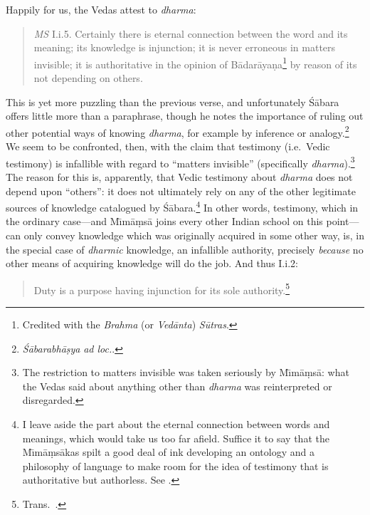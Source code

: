 ﻿\documentclass[11pt]{amsart}
\begin{document}
Happily for us, the Vedas attest to \emph{dharma}:\small \begin{quote}\emph{MS} I.i.5. Certainly there is eternal connection between the word and its meaning; its knowledge is injunction; it is never erroneous in matters invisible; it is authoritative in the opinion of B\=adar\=aya\d na\footnote{Credited with the \emph{Brahma} (or \emph{Ved\=anta}) \emph{S\=utras}.} by reason of its not depending on others.\end{quote}\normalsize This is yet more puzzling than the previous verse, and unfortunately \small\'S\normalsize \=abara offers little more than a paraphrase, though he notes the importance of ruling out other potential ways of knowing \emph{dharma}, for example by inference or analogy.\footnote{\emph{\'S\=abarabh\=a\d sya} \emph{ad loc.}.} We seem to be confronted, then, with the claim that testimony (i.e.~Vedic testimony) is infallible with regard to ``matters invisible'' (specifically \emph{dharma}).\footnote{The restriction to matters invisible was taken seriously by M\={\i}m\=a\d ms\=a: what the Vedas said about anything other than \emph{dharma} was reinterpreted or disregarded.\label{invisiblenote}} The reason for this is, apparently, that Vedic testimony about \emph{dharma} does not depend upon ``others'': it does not ultimately rely on any of the other legitimate sources of knowledge catalogued by \small\'S\normalsize \=abara.\footnote{I leave aside the part about the eternal connection between words and meanings, which would take us too far afield. Suffice it to say that the M\={\i}m\=a\d ms\=akas spilt a good deal of ink developing an ontology and a philosophy of language to make room for the idea of testimony that is authoritative but authorless. See \citet{tabereternality}.} In other words, testimony, which in the ordinary case---and M\={\i}m\=a\d ms\=a joins every other Indian school on this point---can only convey knowledge which was originally acquired in some other way, is, in the special case of \emph{dharmic} knowledge, an infallible authority, precisely \emph{because} no other means of acquiring knowledge will do the job. And thus I.i.2:\small \begin{quote}Duty is a purpose having injunction for its sole authority.\footnote{Trans.~\citet{jha1907skb}.}\end{quote}\normalsize
\end{document}
